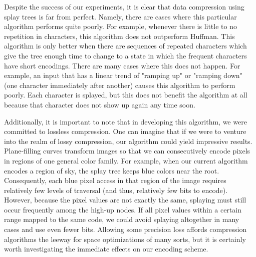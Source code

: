 \documentclass[twoside]{article}
\begin{document}
\begin{multicols}{2}

Despite the success of our experiments, it is clear that data compression using splay trees is far from perfect. Namely, there are cases where this particular algorithm performs quite poorly. For example, whenever there is little to no repetition in characters, this algorithm does not outperform Huffman. This algorithm is only better when there are sequences of repeated characters which give the tree enough time to change to a state in which the frequent characters have short encodings. There are many cases where this does not happen. For example, an input that has a linear trend of "ramping up" or "ramping down" (one character immediately after another) causes this algorithm to perform poorly. Each character is splayed, but this does not benefit the algorithm at all because that character does not show up again any time soon. 

Additionally, it is important to note that in developing this algorithm, we were committed to lossless compression. One can imagine that if we were to venture into the realm of lossy compression, our algorithm could yield impressive results. Plane-filling curves transform images so that we can consecutively encode pixels in regions of one general color family. For example, when our current algorithm encodes a region of sky, the splay tree keeps blue colors near the root. Consequently, each blue pixel access in that region of the image requires relatively few levels of traversal (and thus, relatively few bits to encode). However, because the pixel values are not exactly the same, splaying must still occur frequently among the high-up nodes. If all pixel values within a certain range mapped to the same code, we could avoid splaying altogether in many cases and use even fewer bits. Allowing some precision loss affords compression algorithms the leeway for space optimizations of many sorts, but it is certainly worth investigating the immediate effects on our encoding scheme.


\end{multicols}
\end{document}
